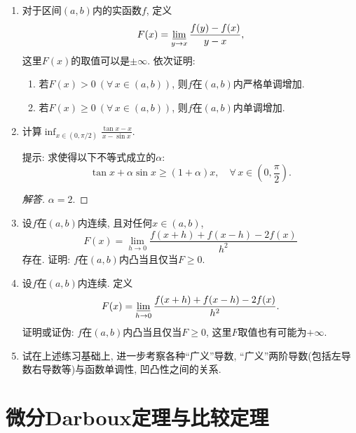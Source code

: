 \begin{3b}
\begin{enumerate}
\begin{proof}
(2)若\(m\)为正偶数, 同理可得\[G(x_1)>0,G(x_2)>0,\cdots,G(x_m)>0,\]
即\((-1)^{k}G(x_k)<0\). 同理有\(\xi_k\in(x_k,x_{k+1})\) \((k=1,2,\cdots,m-1)\)使得\(G(\xi_k)=0\), 也存在\(A>x_m\)使得\(G(A)>0\), 
从而有\(\xi_m\in(x_m,A)\)使得\(G(\xi_m)=0\), 这便得到了\(G(x)\)的\(m\)个实零点. 
若除诸\(\xi_k\) \((k=1,2,\cdots,m)\)之外, \(G(x)\)还有其他实零点.
\end{proof}
\item 对于区间\((a,b)\)内的实函数\(f\), 定义
\[F(x)=\varliminf_{y\rightarrow x}\frac{f(y)-f(x)}{y-x},\]
这里\(F(x)\)的取值可以是\(\pm\infty\). 依次证明:
\begin{enumerate}[label=(\arabic*)]
\item 若\(F(x)>0\ (\forall\,x\in(a,b))\), 则\(f\)在\((a,b)\)内严格单调增加.
\item 若\(F(x)\geqslant 0\ (\forall\,x\in(a,b))\), 则\(f\)在\((a,b)\)内单调增加.
\end{enumerate}
\item 计算\(\inf_{x\in\left(0,\pi/2\right)}\frac{\tan x-x}{x-\sin x}\).

提示: 求使得以下不等式成立的\(\alpha\):
\[\tan x+\alpha\sin x\geqslant (1+\alpha)x,\quad\forall\,x\in\left(0,\frac{\pi}{2}\right).\]
\begin{proof}[解答]
\(\alpha=2.\)
\end{proof}
\item 设\(f\)在\((a,b)\)内连续, 且对任何\(x\in(a,b)\),
\[F(x)=\lim_{h\rightarrow 0}\frac{f(x+h)+f(x-h)-2f(x)}{h^2}\]
存在. 证明: \(f\)在\((a,b)\)内凸当且仅当\(F\geqslant 0\).
\item 设\(f\)在\((a,b)\)内连续. 定义\[F(x)=\varliminf_{h\rightarrow 0}\frac{f(x+h)+f(x-h)-2f(x)}{h^2}.\]
证明或证伪: \(f\)在\((a,b)\)内凸当且仅当\(F\geqslant 0\), 这里\(F\)取值也有可能为\(+\infty\).
\item 试在上述练习基础上, 进一步考察各种``广义''导数, ``广义''两阶导数(包括左导数右导数等)与函数单调性, 凹凸性之间的关系.
\end{enumerate}
\end{3b}

\section{微分Darboux定理与比较定理}
